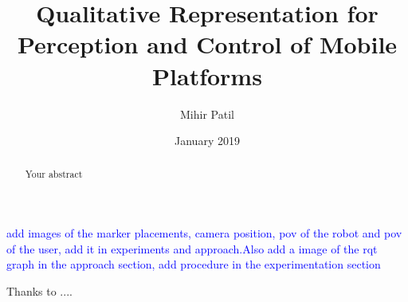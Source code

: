 \documentclass[rnd]{mas_report}
\author{Mihir Patil}
\title{Qualitative Representation for Perception and Control of Mobile Platforms}
\date{January  2019}
\begin{document}
\begin{titlepage}
    \maketitle
\end{titlepage}


\pagestyle{plain}


\cleardoublepage
\statementpage

\begin{abstract}
Your abstract
\end{abstract}

\textcolor{blue}{add images of the marker placements, camera position, pov of the robot and pov of the user, add it in experiments and approach.Also add a image of the rqt graph in the approach section, add procedure in the experimentation section}
\begin{acknowledgements}
Thanks to ....
\end{acknowledgements}


\tableofcontents
\listoffigures
\listoftables


\mainmatter %

\pagestyle{mainmatter}










\begin{appendices}


\end{appendices}

\backmatter

\end{document}
